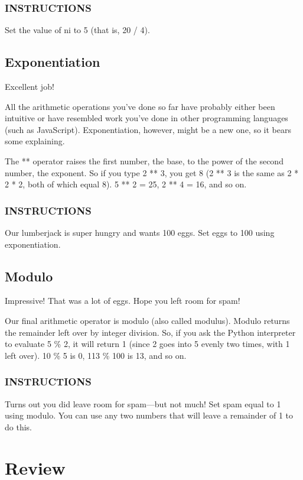 \documentclass[12pt,a4paper,final,twoside,onecolumn,titlepage]{book}
\begin{document}
\subsubsection{INSTRUCTIONS}
Set the value of ni to 5 (that is, 20 / 4).

\subsection{Exponentiation}
Excellent job!

All the arithmetic operations you've done so far have probably either been intuitive or have resembled work you've done in other programming languages (such as JavaScript). Exponentiation, however, might be a new one, so it bears some explaining.

The ** operator raises the first number, the base, to the power of the second number, the exponent. So if you type 2 ** 3, you get 8 (2 ** 3 is the same as 2 * 2 * 2, both of which equal 8). 5 ** 2 = 25, 2 ** 4 = 16, and so on.

\subsubsection{INSTRUCTIONS}
Our lumberjack is super hungry and wants 100 eggs. Set eggs to 100 using exponentiation.

\subsection{Modulo}
Impressive! That was a lot of eggs. Hope you left room for spam!

Our final arithmetic operator is modulo (also called modulus). Modulo returns the remainder left over by integer division. So, if you ask the Python interpreter to evaluate 5 \% 2, it will return 1 (since 2 goes into 5 evenly two times, with 1 left over). 10 \% 5 is 0, 113 \% 100 is 13, and so on.

\subsubsection{INSTRUCTIONS}
Turns out you did leave room for spam—but not much! Set spam equal to 1 using modulo. You can use any two numbers that will leave a remainder of 1 to do this.

\section{Review}
\end{document}

